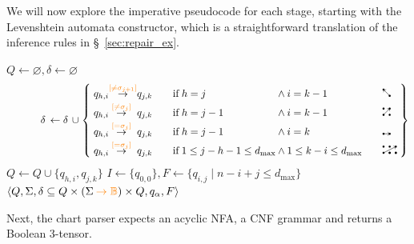 \documentclass[sigplan,acmsmall,nonacm,screen]{acmart}\settopmatter{printfolios=false,printccs=false,printacmref=false}
\begin{document}
\noindent We will now explore the imperative pseudocode for each stage, starting with the Levenshtein automata constructor, which is a straightforward translation of the inference rules in \S~\ref{sec:repair_ex}.

\begin{algorithm}[H]
\caption{\texttt{lev\_build} pseudocode}
\label{alg:lev_build}
\begin{algorithmic}[1]
   
  \State $Q \gets \varnothing, \delta \gets \varnothing$
    \State \vspace{-1.65cm}\[\hspace{1.15cm}\delta\,\gets \delta\,\cup\:\!\left\{
        \begin{alignedat}{9}
          &\;& q_{h,i} &\hspace{-0.1cm}\overset{{\color{orange}[\neq\sigma_{j+1}]}}{\rightarrow} &q_{j,k} &\qquad& \text{if}\;& h = j   &\:\land\:& i = k-1  &\qquad& \duparrow\\[-2pt]
          && q_{h,i}   &\overset{{\color{orange}[\neq\sigma_j]}}{\rightarrow} &q_{j,k} &&       \text{if}\;& h = j-1 &\:\land\:& i = k-1  &&       \ddiagarrow\\[-2pt]
          && q_{h,i}   &\overset{{\color{orange}[=\sigma_j]}}{\rightarrow}    &q_{j,k} &&       \text{if}\;& h = j-1 &\:\land\:& i = k    &&       \drightarrow\\[-2pt]
          && q_{h,i}   &\overset{{\color{orange}[=\sigma_j]}}{\rightarrow}    &q_{j,k} &&       \text{if}\;& 1 \leq j - h - 1 \leq d_{\max} &\:\land\:& 1 \leq k - i \leq d_{\max}   && \knightarrow\;
        \end{alignedat}
      \right\}\]
    \State $Q \gets Q \cup \{q_{h,i}, q_{j,k}\}$
  \EndFor
  \State $I \gets \{q_{0,0}\}, F \gets \{q_{i, j} \mid n - i + j \leq d_{\max}\}$
  \State \Return $\langle Q, \Sigma, \delta \subseteq Q \times (\Sigma\:{\color{orange}\rightarrow \mathbb{B}}) \times Q, q_\alpha, F\rangle$  
\end{algorithmic}
\end{algorithm}\vspace{-0.2cm}

\noindent Next, the chart parser expects an acyclic NFA, a CNF grammar and returns a Boolean 3-tensor.
\end{document}
